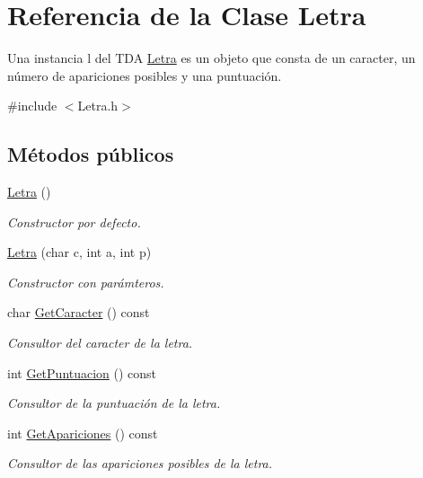 \hypertarget{classLetra}{}\section{Referencia de la Clase Letra}
\label{classLetra}


Una instancia l del T\+DA \hyperlink{classLetra}{Letra} es un objeto que consta de un caracter, un número de apariciones posibles y una puntuación.  




{\ttfamily \#include $<$Letra.\+h$>$}

\subsection*{Métodos públicos}
\begin{DoxyCompactItemize}
\item 
\mbox{\label{classLetra_a2e236c67e3630258c6d3d9f2a9e66709}} 
\hyperlink{classLetra_a2e236c67e3630258c6d3d9f2a9e66709}{Letra} ()
\begin{DoxyCompactList}\small\item\em Constructor por defecto. \end{DoxyCompactList}\item 
\hyperlink{classLetra_ab4e8182ee4fddf13bb77624a2abaa6db}{Letra} (char c, int a, int p)
\begin{DoxyCompactList}\small\item\em Constructor con parámteros. \end{DoxyCompactList}\item 
char \hyperlink{classLetra_a7459718d7d7eb8244372a6de96326152}{Get\+Caracter} () const
\begin{DoxyCompactList}\small\item\em Consultor del caracter de la letra. \end{DoxyCompactList}\item 
int \hyperlink{classLetra_a074ee96643747004f1460c2450071d5e}{Get\+Puntuacion} () const
\begin{DoxyCompactList}\small\item\em Consultor de la puntuación de la letra. \end{DoxyCompactList}\item 
int \hyperlink{classLetra_aaacdfd12c1e7092b1e847441a8b94c8a}{Get\+Apariciones} () const
\begin{DoxyCompactList}\small\item\em Consultor de las apariciones posibles de la letra. \end{DoxyCompactList}\item 

\end{DoxyCompactItemize}
